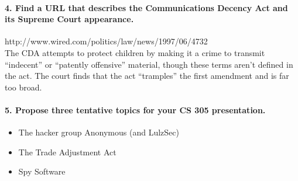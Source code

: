 \documentclass{article}
\begin{document}
\paragraph{4. Find a URL that describes the Communications Decency Act and its Supreme Court appearance.\\}
http://www.wired.com/politics/law/news/1997/06/4732\\
The CDA attempts to protect children by making it a crime to transmit ``indecent'' or ``patently offensive'' material, though these terms aren't defined in the act.
The court finds that the act ``tramples'' the first amendment and is far too broad.

\paragraph{5. Propose three tentative topics for your CS 305 presentation.\\}
\begin{itemize}
\item The hacker group Anonymous (and LulzSec)
\item The Trade Adjustment Act
\item Spy Software
\end{itemize}
\end{document}
